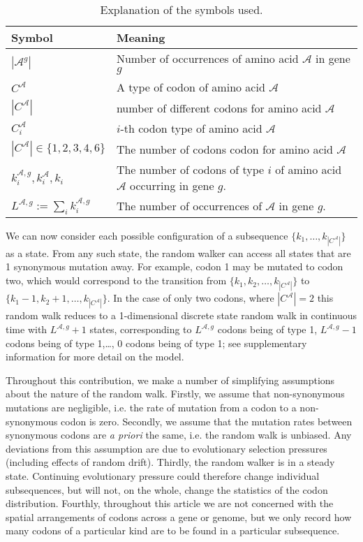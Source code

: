 \documentclass[a4paper,10pt]{paper}%
\begin{document}
%
%
\begin{table}
\centering
\begin{tabular}{|l|l|}
{\bf Symbol}& {\bf Meaning} \\\hline
$|\mathcal A^g|$ 		& 	 Number of occurrences of  amino acid $\mathcal A$ in gene $g$\\\hline
$C^\mathcal A$ 		& 		A type of codon of amino acid $\mathcal A$\\\hline
$|C^\mathcal A|$ 		& number of  different codons for  amino acid $\mathcal A$\\\hline
$C_i^\mathcal A$ 		& 		$i$-th  codon type of amino acid $\mathcal A$\\\hline
$|C^\mathcal A|\in \{1,2,3,4,6\}$ 		& 		The number of codons codon for  amino acid $\mathcal A$\\\hline
$k^{\mathcal A,g}_i,k^\mathcal A_i, k_i$ 		& The number of codons of type $i$ of amino acid $\mathcal A$ occurring in gene $g$.\\\hline
$L^{\mathcal A,g} := \sum_i k^{\mathcal A,g}_i$ 		& 		The number of occurrences of $\mathcal A$  in gene $g$.\\\hline
\end{tabular}
\caption{Explanation of the symbols used.}
\label{symbols}
\end{table}
%
%
\par
We can now consider each possible configuration of a subsequence  $\{k_1,\ldots, k_{|C^\mathcal A|}\}$ as a  state. From any such state, the random walker can access all states that are 1 synonymous mutation away.  
For example, codon 1 may be mutated to codon two, which would correspond to the transition from $\{k_1, k_2, \ldots, k_{|C^\mathcal A|}\}$  to $\{k_1-1,k_2+1, \ldots, k_{|C^\mathcal A|}\}$. In the case of only two codons, where  $|C^\mathcal A|=2$ this random walk reduces to a 1-dimensional discrete state random walk in continuous time with $L^{\mathcal A,g} +1$ states, corresponding to $L^{\mathcal A,g}$ codons being of type 1, $L^{\mathcal A,g}-1$ codons being of type 1,\ldots, $0$ codons being of type 1;     see supplementary information for more detail on the model. 
\par%
Throughout this contribution, we make a number of simplifying assumptions about the nature of  the random walk. Firstly, we assume that non-synonymous mutations are negligible, i.e. the rate of mutation from a codon to a non-synonymous codon is zero. Secondly, we  assume that the mutation rates between synonymous codons are {\em a priori} the same, i.e. the random walk is unbiased. Any deviations from this assumption are due to evolutionary selection pressures (including effects of random drift).   Thirdly, the random walker is  in  a steady state. Continuing evolutionary pressure could therefore change individual subsequences, but will not, on the whole, change the statistics of the codon distribution. Fourthly, throughout this article we are not concerned with the spatial arrangements of codons across a gene or genome, but we only record how many codons of a particular kind are to be found in a particular subsequence.    
\end{document}
